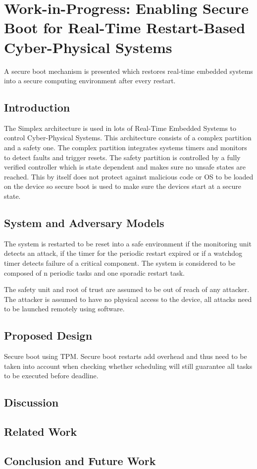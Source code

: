 \documentclass{article}
\begin{document}
\section{Work-in-Progress: Enabling Secure Boot for Real-Time Restart-Based Cyber-Physical Systems}

A secure boot mechanism is presented which restores real-time embedded systems into a secure computing environment after every restart. 

\subsection{Introduction}

The Simplex architecture is used in lots of Real-Time Embedded Systems to control Cyber-Physical Systems. This architecture consists of a complex partition and a safety one. The complex partition integrates systems timers and monitors to detect faults and trigger resets. The safety partition is controlled by a fully verified controller which is state dependent and makes sure no unsafe states are reached. This by itself does not protect against malicious code or OS to be loaded on the device so secure boot is used to make sure the devices start at a secure state.

\subsection{System and Adversary Models}

The system is restarted to be reset into a safe environment if the monitoring unit detects an attack, if the timer for the periodic restart expired or if a watchdog timer detects failure of a critical component. The system is considered to be composed of n periodic tasks and one sporadic restart task.
\medskip

The safety unit and root of trust are assumed to be out of reach of any attacker. The attacker is assumed to have no physical access to the device, all attacks need to be launched remotely using software.

\subsection{Proposed Design}

Secure boot using TPM. Secure boot restarts add overhead and thus need to be taken into account when checking whether scheduling will still guarantee all tasks to be executed before deadline.

\subsection{Discussion}

\subsection{Related Work}

\subsection{Conclusion and Future Work}
\end{document}
